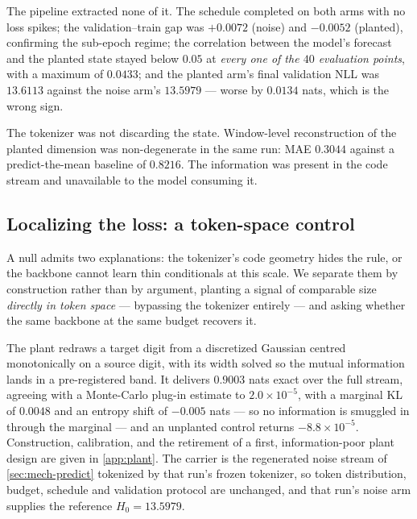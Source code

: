 The pipeline extracted none of it. The schedule completed on both arms with no loss spikes; the
validation--train gap was $+0.0072$ (noise) and $-0.0052$ (planted), confirming the sub-epoch
regime; the correlation between the model's forecast and the planted state stayed below $0.05$ at
\emph{every one of the $40$ evaluation points}, with a maximum of $0.0433$; and the planted arm's
final validation NLL was $13.6113$ against the noise arm's $13.5979$ --- worse by $0.0134$ nats,
which is the wrong sign.

The tokenizer was not discarding the state. Window-level reconstruction of the planted dimension
was non-degenerate in the same run: MAE $0.3044$ against a predict-the-mean baseline of $0.8216$.
The information was present in the code stream and unavailable to the model consuming it.

\subsection{Localizing the loss: a token-space control}
\label{sec:mech-localize}

A null admits two explanations: the tokenizer's code geometry hides the rule, or the backbone
cannot learn thin conditionals at this scale. We separate them by construction rather than by
argument, planting a signal of comparable size \emph{directly in token space} --- bypassing the
tokenizer entirely --- and asking whether the same backbone at the same budget recovers it.

The plant redraws a target digit from a discretized Gaussian centred monotonically on a source
digit, with its width solved so the mutual information lands in a pre-registered band. It delivers
$0.9003$ nats exact over the full stream, agreeing with a Monte-Carlo plug-in estimate to
$2.0\times10^{-5}$, with a marginal KL of $0.0048$ and an entropy shift of $-0.005$ nats --- so no
information is smuggled in through the marginal --- and an unplanted control returns
$-8.8\times10^{-5}$. Construction, calibration, and the retirement of a first, information-poor
plant design are given in \cref{app:plant}.
The carrier is the regenerated noise stream of \cref{sec:mech-predict} tokenized by that run's
frozen tokenizer, so token distribution, budget, schedule and validation protocol are unchanged,
and that run's noise arm supplies the reference $H_0 = 13.5979$.

